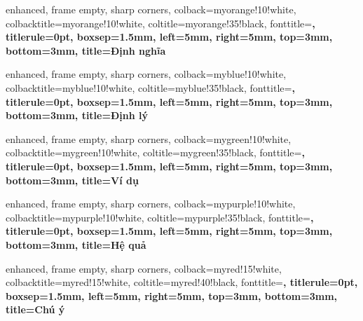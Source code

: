   {
    enhanced, frame empty, sharp corners,
    colback=myorange!10!white,
    colbacktitle=myorange!10!white,
    coltitle=myorange!35!black, fonttitle=\sffamily\bfseries,
    titlerule=0pt,
    boxsep=1.5mm, left=5mm, right=5mm, top=3mm, bottom=3mm,
    title={\hspace{0.5em}Định nghĩa~\thetcbcounter{}}
  }
  {}

  {
    enhanced, frame empty, sharp corners,
    colback=myblue!10!white, colbacktitle=myblue!10!white,
    coltitle=myblue!35!black, fonttitle=\sffamily\bfseries,
    titlerule=0pt,
    boxsep=1.5mm, left=5mm, right=5mm, top=3mm, bottom=3mm,
    title={\hspace{0.5em}Định lý~\thetcbcounter{}}
  }
  {}

  {
    enhanced, frame empty, sharp corners,
    colback=mygreen!10!white, colbacktitle=mygreen!10!white,
    coltitle=mygreen!35!black, fonttitle=\sffamily\bfseries,
    titlerule=0pt,
    boxsep=1.5mm, left=5mm, right=5mm, top=3mm, bottom=3mm,
    title={\hspace{0.5em}Ví dụ~\thetcbcounter{}}
  }
  {}

  {
    enhanced, frame empty, sharp corners,
    colback=mypurple!10!white, colbacktitle=mypurple!10!white,
    coltitle=mypurple!35!black, fonttitle=\sffamily\bfseries,
    titlerule=0pt,
    boxsep=1.5mm, left=5mm, right=5mm, top=3mm, bottom=3mm,
    title={\hspace{0.5em}Hệ quả~\thetcbcounter{}}
  }
  {}

  {
    enhanced, frame empty, sharp corners,
    colback=myred!15!white, colbacktitle=myred!15!white,
    coltitle=myred!40!black, fonttitle=\sffamily\bfseries,
    titlerule=0pt,
    boxsep=1.5mm, left=5mm, right=5mm, top=3mm, bottom=3mm,
    title={\hspace{0.5em}Chú ý~\thetcbcounter{}}
  }
  {}


